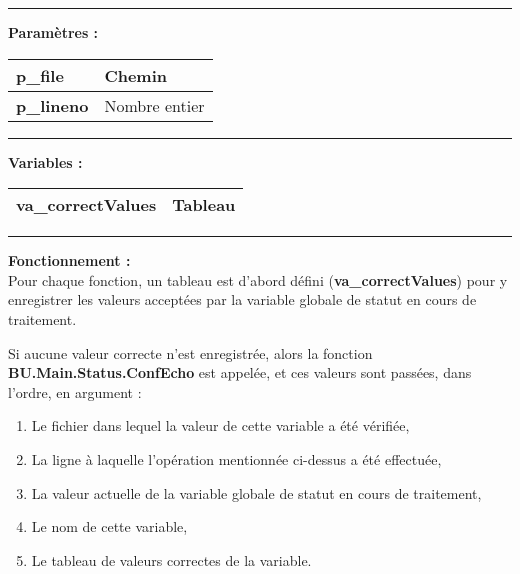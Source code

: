 \documentclass[a4paper,10pt]{article}
\begin{document}

\par\noindent\rule{\textwidth}{0.4pt}

\begin{justify}
    \textbf{Paramètres :}

    \begin{tabular}{|l|l|}
        \hline
        \textbf{\color{vars}p\_file} & Chemin\\
        \hline
        \textbf{\color{vars}p\_lineno} & Nombre entier\\
        \hline
    \end{tabular}
\end{justify}

\setlength{\parskip}{2em}


\par\noindent\rule{\textwidth}{0.4pt}\setlength{\parskip}{1em}

\begin{justify}
    \textbf{Variables :}

    \begin{tabular}{|l|l|}
        \hline
        \textbf{\color{vars}va\_correctValues} & Tableau\\
        \hline
    \end{tabular}
\end{justify}\setlength{\parskip}{1em}


\par\noindent\rule{\textwidth}{0.4pt}

\begin{justify}
    \textbf{Fonctionnement :}\\[1\baselineskip]
    Pour chaque fonction, un tableau est d'abord défini (\textbf{\color{vars}va\_correctValues}) pour y enregistrer les valeurs acceptées par la variable globale de statut en cours de traitement.
\end{justify}

\begin{justify}
    Si aucune valeur correcte n'est enregistrée, alors la fonction \textbf{\color{func}BU.Main.Status.ConfEcho} est appelée, et ces valeurs sont passées, dans l'ordre, en argument :

    \begin{enumerate}
        \item Le fichier dans lequel la valeur de cette variable a été vérifiée,
        \item La ligne à laquelle l'opération mentionnée ci-dessus a été effectuée,
        \item La valeur actuelle de la variable globale de statut en cours de traitement,
        \item Le nom de cette variable,
        \item Le tableau de valeurs correctes de la variable.
    \end{enumerate}
\end{justify}
\end{document}

